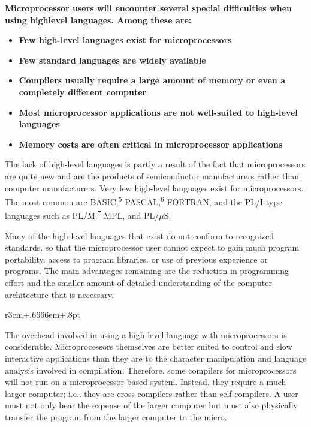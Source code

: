 \documentclass{book}
\begin{document}
\textbf{Microprocessor users will encounter several special difficulties when using highlevel languages. Among these are:}
\begin{itemize}
\item\textbf{Few high-level languages exist for microprocessors}
\item\textbf{Few standard languages are widely available}
\item\textbf{Compilers usually require a large amount of memory or even a completely different computer}
\item\textbf{Most microprocessor applications are not well-suited to high-level languages}
\item\textbf{Memory costs are often critical in microprocessor applications}
\end{itemize}
The lack of high-level languages is partly a result of the fact that microprocessors are quite new and are the products of semiconductor manufacturers rather than computer manufacturers. Very few high-level languages exist for microprocessors. The most common are BASIC,\textsuperscript{5} PASCAL,\textsuperscript{6} FORTRAN, and the PL/I-type languages such as PL/M.\textsuperscript{7} MPL, and PL/$\mu$S.

Many of the high-level languages that exist do not conform to recognized standards. so that the microprocessor user cannot expect to gain much program portability. access to program libraries. or use of previous experience or programs. The main advantages remaining are the reduction in programming effort and the smaller amount of detailed understanding of the computer architecture that is necessary.

\begin{wrapfigure}{r}{3cm+.6666em+.8pt}
\end{wrapfigure}
The overhead involved in using a high-level language with microprocessors is considerable. Microprocessors themselves are better suited to control and slow interactive applications than they are to the character manipulation and language analysis involved in compilation. Therefore. some compilers for microprocessors will not run on a microprocessor-based system. Instead. they require a much larger computer; i.e.. they are cross-compilers rather than self-compilers. A user must not only bear the expense of the larger computer but must also physically transfer the program from the larger computer to the micro.
\end{document}
